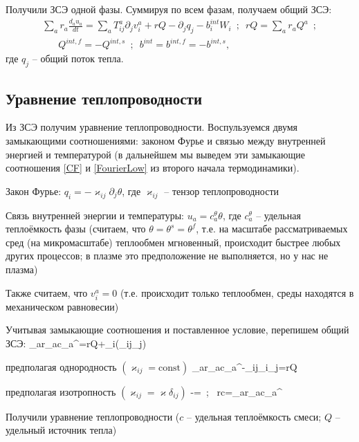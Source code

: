 \documentclass[main.tex]{subfiles}
\begin{document}
Получили ЗСЭ одной фазы. Суммируя по всем фазам, получаем общий ЗСЭ:
\begin{multline}
\sum\limits_{a}{r_a\frac{d_au_a}{dt}}=\sum\limits_{a}{T_{ij}^a\partial_jv_i^a+rQ-\partial_jq_j-b_i^{int}W_i}\,\,\,;\,\,\,rQ=\sum\limits_{a}{r_aQ^a}\,\,\,;\\ \,\,\,\,\,\,\,\,\,\,Q^{int,f}=-Q^{int,s}\,\,\,;\,\,\,b^{int}=b^{int,f}=-b^{int,s},
\end{multline}
где $q_j$ -- общий поток тепла.

\subsection{Уравнение теплопроводности}

Из ЗСЭ получим уравнение теплопроводности. Воспульзуемся двумя замыкающими соотношениями: законом Фурье и связью между внутренней энергией и температурой (в дальнейшем мы выведем эти замыкающие соотношения \eqref{CF} и \eqref{FourierLow} из второго начала термодинамики).

Закон Фурье: $q_i=-\varkappa_{ij}\partial_j\theta$, где $\varkappa_{ij}$ -- тензор теплопроводности

Связь внутренней энергии и температуры: $u_a=c_a^\theta\theta$, где $c_a^\theta$ -- удельная теплоёмкость фазы (считаем, что $\theta=\theta^s=\theta^f$, т.е. на масштабе рассматриваемых сред (на микромасштабе) теплообмен мгновенный, происходит быстрее любых других процессов; в плазме это предположение не выполняется, но у нас не плазма)

Также считаем, что $v_i^a=0$ (т.е. происходит только теплообмен, среды находятся в механическом равновесии)

Учитывая замыкающие соотношения и поставленное условие, перепишем общий ЗСЭ:
\beq\label{HT}
\sum\limits_{a}{r_ac_a^\theta{}}=rQ+\partial_i\left(\varkappa_{ij}\partial_j\theta\right)
\eeq

предполагая однородность $\left(\varkappa_{ij}=\text{const}\right)$
\beq\label{HeatTransfer}
\sum\limits_{a}{r_ac_a^\theta{}}-\varkappa_{ij}\partial_i\partial_j\theta=rQ
\eeq

предполагая изотропность $\left(\varkappa_{ij}=\varkappa\delta_{ij}\right)$
\beq
{}-\Delta\theta=\,\,\,;\,\,\, rc=\sum\limits_{a}{r_ac_a^\theta}
\eeq

Получили уравнение теплопроводности ($c$ -- удельная теплоёмкость смеси; $Q$ -- удельный источник тепла)
\end{document}
